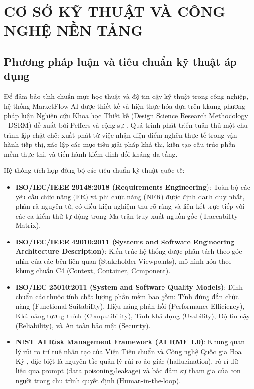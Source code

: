 \chapter{CƠ SỞ KỸ THUẬT VÀ CÔNG NGHỆ NỀN TẢNG}

\section{Phương pháp luận và tiêu chuẩn kỹ thuật áp dụng}

Để đảm bảo tính chuẩn mực học thuật và độ tin cậy kỹ thuật trong công nghiệp, hệ thống MarketFlow AI được thiết kế và hiện thực hóa dựa trên khung phương pháp luận Nghiên cứu Khoa học Thiết kế (Design Science Research Methodology - DSRM) đề xuất bởi Peffers và cộng sự \cite{peffers2007dsrm}. Quá trình phát triển tuân thủ một chu trình lặp chặt chẽ: xuất phát từ việc nhận diện điểm nghẽn thực tế trong vận hành tiếp thị, xác lập các mục tiêu giải pháp khả thi, kiến tạo cấu trúc phần mềm thực thi, và tiến hành kiểm định đối kháng đa tầng.

Hệ thống tích hợp đồng bộ các tiêu chuẩn kỹ thuật quốc tế:
\begin{itemize}
  \item \textbf{ISO/IEC/IEEE 29148:2018 (Requirements Engineering)}: Toàn bộ các yêu cầu chức năng (FR) và phi chức năng (NFR) được định danh duy nhất, phân rã nguyên tử, có điều kiện nghiệm thu rõ ràng và liên kết trực tiếp với các ca kiểm thử tự động trong Ma trận truy xuất nguồn gốc (Traceability Matrix).
  \item \textbf{ISO/IEC/IEEE 42010:2011 (Systems and Software Engineering -- Architecture Description)}: Kiến trúc hệ thống được phân tách theo góc nhìn của các bên liên quan (Stakeholder Viewpoints), mô hình hóa theo khung chuẩn C4 (Context, Container, Component).
  \item \textbf{ISO/IEC 25010:2011 (System and Software Quality Models)}: Định chuẩn các thuộc tính chất lượng phần mềm bao gồm: Tính đúng đắn chức năng (Functional Suitability), Hiệu năng phản hồi (Performance Efficiency), Khả năng tương thích (Compatibility), Tính khả dụng (Usability), Độ tin cậy (Reliability), và An toàn bảo mật (Security).
  \item \textbf{NIST AI Risk Management Framework (AI RMF 1.0)}: Khung quản lý rủi ro trí tuệ nhân tạo của Viện Tiêu chuẩn và Công nghệ Quốc gia Hoa Kỳ \cite{nist-airmf,nist-genai-profile}, đặc biệt là nguyên tắc quản lý rủi ro ảo giác (hallucination), rò rỉ dữ liệu qua prompt (data poisoning/leakage) và bảo đảm sự tham gia của con người trong chu trình quyết định (Human-in-the-loop).
\end{itemize}

